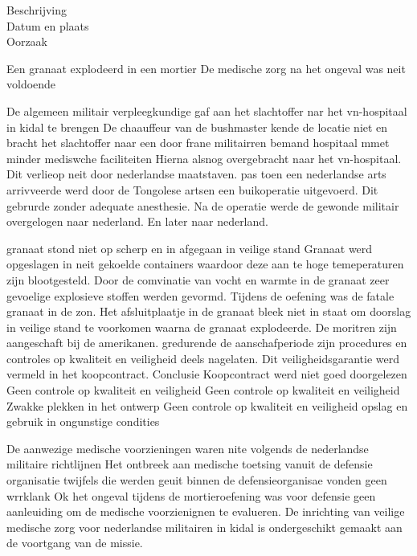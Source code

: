 {{{{{{{{{{{{{{	\begin{description}
	\item[Beschrijving]
	\item[Datum en plaats] 
	\item[Oorzaak]
\end{description}
Een granaat explodeerd in een mortier
De medische zorg na het ongeval was neit voldoende


De algemeen militair verpleegkundige gaf aan het slachtoffer nar het vn-hospitaal in kidal te brengen
De chaauffeur van de bushmaster kende de locatie niet  en bracht het slachtoffer naar een door frane militairren bemand hospitaal mmet minder mediswche faciliteiten
Hierna alsnog overgebracht naar het vn-hospitaal.
Dit verlieop  neit door nederlandse maatstaven.
pas toen een nederlandse arts arrivveerde werd door de Tongolese artsen een buikoperatie uitgevoerd.
Dit gebrurde zonder adequate anesthesie.
Na de operatie werde de gewonde militair overgelogen naar nederland. En later naar nederland.


granaat stond niet op scherp en in afgegaan in veilige stand
Granaat werd opgeslagen in neit gekoelde containers waardoor deze aan te hoge temeperaturen zijn blootgesteld.
Door de comvinatie van vocht en warmte in de granaat zeer gevoelige explosieve stoffen werden gevormd.
Tijdens de oefening was de fatale granaat in de zon.
Het afsluitplaatje in de granaat bleek niet in staat om doorslag in veilige stand te voorkomen waarna de granaat explodeerde.
De moritren zijn aangeschaft bij de amerikanen. gredurende de aanschafperiode zijn procedures en controles op kwaliteit en veiligheid deels nagelaten.
Dit veiligheidsgarantie werd vermeld in het koopcontract.
Conclusie
Koopcontract werd niet goed doorgelezen
Geen controle op kwaliteit en veiligheid
Geen controle op kwaliteit en veiligheid
Zwakke plekken in het ontwerp
Geen controle op kwaliteit en veiligheid
opslag en gebruik in ongunstige condities

De aanwezige medische voorzieningen waren nite volgends de nederlandse militaire richtlijnen
Het ontbreek aan medische toetsing vanuit de defensie organisatie
twijfels die werden geuit binnen de defensieorganisae vonden geen wrrklank
Ok het ongeval tijdens de mortieroefening was voor defensie geen aanleuiding om de medische voorzienignen te evalueren.
De inrichting van veilige medische zorg voor nederlandse militairen in kidal is ondergeschikt gemaakt aan de voortgang van de missie.


}}}}}}}}}}}}}}
